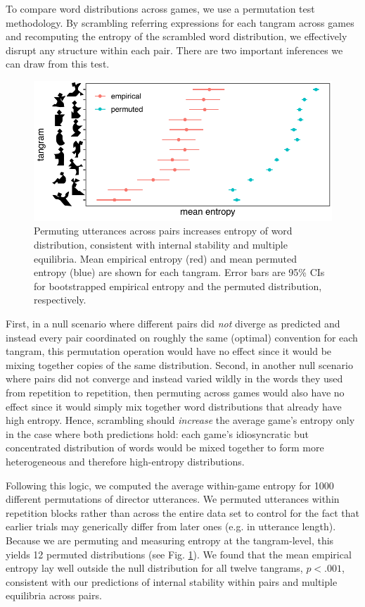 \documentclass[alpha-refs]{wiley-article}
\begin{document}
To compare word distributions across games, we use a permutation test methodology.
By scrambling referring expressions for each tangram across games and recomputing the entropy of the scrambled word distribution, we effectively disrupt any structure within each pair.
There are two important inferences we can draw from this test.
\begin{figure}[t!]
\centering
\includegraphics[scale=.9]{permutedDiscrete.pdf}
\caption{Permuting utterances across pairs increases entropy of word distribution, consistent with internal stability and multiple equilibria. Mean empirical entropy (red) and mean permuted entropy (blue) are shown for each tangram. Error bars are 95\% CIs for bootstrapped empirical entropy and the permuted distribution, respectively.}
\label{fig:permuted}
\end{figure}
First, in a null scenario where different pairs did \emph{not} diverge as predicted and instead every pair coordinated on roughly the same (optimal) convention for each tangram, this permutation operation would have no effect since it would be mixing together copies of the same distribution.
Second, in another null scenario where pairs did not converge and instead varied wildly in the words they used from repetition to repetition, then permuting across games would also have no effect since it would simply mix together word distributions that already have high entropy.
Hence, scrambling should \emph{increase} the average game's entropy only in the case where both predictions hold: each game's idiosyncratic but concentrated distribution of words would be mixed together to form more heterogeneous and therefore high-entropy distributions.

Following this logic, we computed the average within-game entropy for 1000 different permutations of director utterances. 
We permuted utterances within repetition blocks rather than across the entire data set to control for the fact that earlier trials may generically differ from later ones (e.g. in utterance length). 
Because we are permuting and measuring entropy at the tangram-level, this yields 12 permuted distributions (see Fig. \ref{fig:permuted}).
We found that the mean empirical entropy lay well outside the null distribution for all twelve tangrams, $p < .001$, consistent with our predictions of internal stability within pairs and multiple equilibria across pairs.
\end{document}
